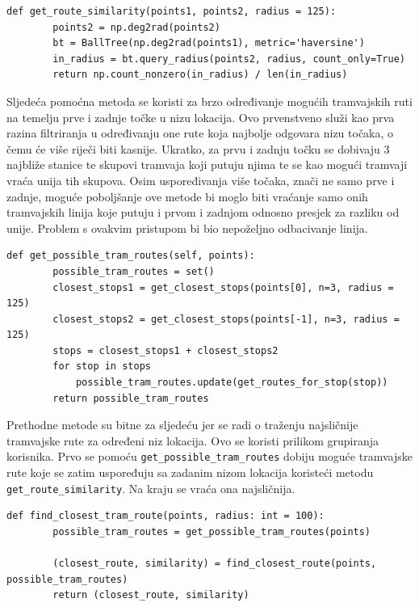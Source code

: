 \documentclass[times, utf8, diplomski]{fer}
\begin{document}
\begin{lstlisting}[caption={Usporedba povijesti lokacija},captionpos=b,label={kod:location_history_comparison}]
    def get_route_similarity(points1, points2, radius = 125):
        points2 = np.deg2rad(points2)
        bt = BallTree(np.deg2rad(points1), metric='haversine')
        in_radius = bt.query_radius(points2, radius, count_only=True)
        return np.count_nonzero(in_radius) / len(in_radius)

\end{lstlisting}

Sljedeća pomoćna metoda se koristi za brzo određivanje mogućih tramvajskih ruti na temelju prve i zadnje točke u nizu lokacija. Ovo prvenstveno služi kao prva razina filtriranja u određivanju one rute koja najbolje odgovara nizu točaka, o čemu će više riječi biti kasnije. Ukratko, za prvu i zadnju točku se dobivaju 3 najbliže stanice te skupovi tramvaja koji putuju njima te se kao mogući tramvaji vraća unija tih skupova. Osim uspoređivanja više točaka, znači ne samo prve i zadnje, moguće poboljšanje ove metode bi moglo biti vraćanje samo onih tramvajskih linija koje putuju i prvom i zadnjom odnosno presjek za razliku od unije. Problem s ovakvim pristupom bi bio nepoželjno odbacivanje linija.

\begin{lstlisting}[caption={Određivanje mogućih tramvajskih ruta},captionpos=b,label={kod:possible_tram_routes}]
    def get_possible_tram_routes(self, points):
        possible_tram_routes = set()
        closest_stops1 = get_closest_stops(points[0], n=3, radius = 125)
        closest_stops2 = get_closest_stops(points[-1], n=3, radius = 125)
        stops = closest_stops1 + closest_stops2
        for stop in stops
            possible_tram_routes.update(get_routes_for_stop(stop))
        return possible_tram_routes

\end{lstlisting}

Prethodne metode su bitne za sljedeću jer se radi o traženju najsličnije tramvajske rute za određeni niz lokacija. Ovo se koristi prilikom grupiranja korisnika. Prvo se pomoću \texttt{get\_possible\_tram\_routes} dobiju moguće tramvajske rute koje se zatim uspoređuju sa zadanim nizom lokacija koristeći metodu \texttt{get\_route\_similarity}. Na kraju se vraća ona najsličnija.

\begin{lstlisting}[caption={Traženje najbliže tramvajske rute},captionpos=b,label={kod:closest_tram_route}]
    def find_closest_tram_route(points, radius: int = 100):
        possible_tram_routes = get_possible_tram_routes(points)

        (closest_route, similarity) = find_closest_route(points, possible_tram_routes)
        return (closest_route, similarity)

\end{lstlisting}
\end{document}
